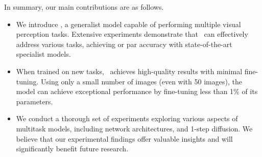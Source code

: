 In summary, our main contributions are as follows.

\begin{itemize}
\itemsep 0cm
    \item We introduce \ours, a generalist model capable of performing multiple visual perception tasks. Extensive 
    experiments 
    demonstrate that \ours\ can effectively address various tasks,
    achieving or par accuracy with state-of-the-art specialist models.
    
    \item When trained on new tasks, \ours\ achieves high-quality results with minimal fine-tuning. Using only a small number of images (even with 50 images), the model can achieve exceptional performance by fine-tuning less than 1\% of its parameters.
    \item We conduct a thorough set of experiments exploring various aspects of multitask models, including network architectures, and 1-step diffusion. We believe that our experimental findings offer valuable insights and will significantly benefit future research.
\end{itemize}
